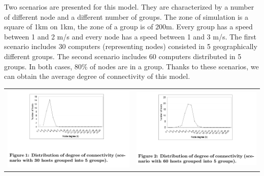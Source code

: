 Two scenarios are presented for this model. They are characterized by a number of different node and a different number of groups.  The zone of simulation is a square of 1km on 1km, the zone of a group is of 200m. Every group has a speed between 1 and 2 m/s and every node has a speed between 1 and 3 m/s. The first scenario includes 30 computers (representing nodes) consisted in 5 geographically different groups. The second scenario includes 60 computers distributed in 5 groups. In both cases, 80\% of nodes are in a group. Thanks to these scenarios, we can obtain the average degree of connectivity of this model.\\

\begin{tabular}{cc}
   \includegraphics[scale=0.7]{../images/degreeConnectivitySocialNetwork30Nodes.png} &
   \includegraphics[scale=0.6]{../images/degreeConnectivitySocialNetwork60Nodes.png} \\
\end{tabular}

